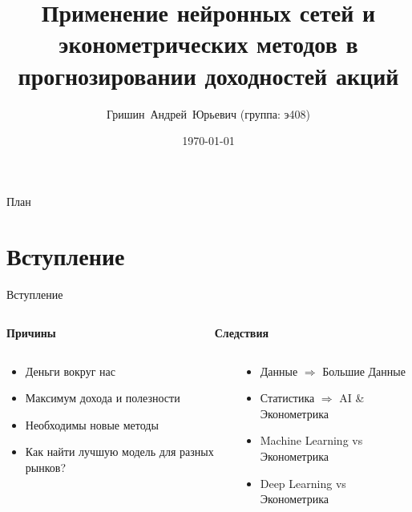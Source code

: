 \documentclass[11pt, aspectratio= 169]{beamer}
\title[Прогнозирование доходностей акций]{Применение нейронных сетей и эконометрических методов в прогнозировании доходностей акций}
\author[Гришин А.Ю.]{Гришин~Андрей~Юрьевич ({\small группа: э408})}
\institute[ЭФ МГУ]{Экономический Факультет Московского Государтвенного Университета}
\date{\today}
\begin{document}
	\begin{frame}
		\maketitle
	\end{frame}
	
	\begin{frame}{План}
		\tableofcontents
	\end{frame}
	
	\section{Вступление}
	\begin{frame}{Вступление}
		\begin{columns}
			\begin{column}{0.5\textwidth}
				\centering
				\begin{LARGE}
					\textbf{Причины}
				\end{LARGE}
			\end{column}
			\begin{column}{0.5\textwidth}
				\centering
				\begin{LARGE}
					\textbf{Следствия}
				\end{LARGE}
			\end{column}
		\end{columns}
		\vspace{0.3cm}
		\begin{columns}
			\begin{column}{0.5\textwidth}
				\large
				\begin{itemize}
					\item Деньги вокруг нас
					\item Максимум дохода и полезности
					\item Необходимы новые методы
					\item Как найти лучшую модель для разных рынков?
				\end{itemize}
			\end{column}
			\hspace{0.5cm}
			\begin{column}{0.5\textwidth}
				\large
				\begin{itemize}
					\item Данные $\Rightarrow$ Большие Данные
					\item Статистика $\Rightarrow$ AI \& Эконометрика
					\item Machine Learning vs Эконометрика
					\item Deep Learning vs Эконометрика
				\end{itemize}
			\end{column}
		\end{columns}
	\end{frame}
	
\end{document}
